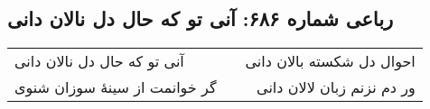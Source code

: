 \begin{center}
\section*{رباعی شماره ۶۸۶: آنی تو که حال دل نالان دانی}
\label{sec:sh686}
\begin{longtable}{l p{0.5cm} r}
آنی تو که حال دل نالان دانی
&&
احوال دل شکسته بالان دانی
\\
گر خوانمت از سینهٔ سوزان شنوی
&&
ور دم نزنم زبان لالان دانی
\\
\end{longtable}
\end{center}
